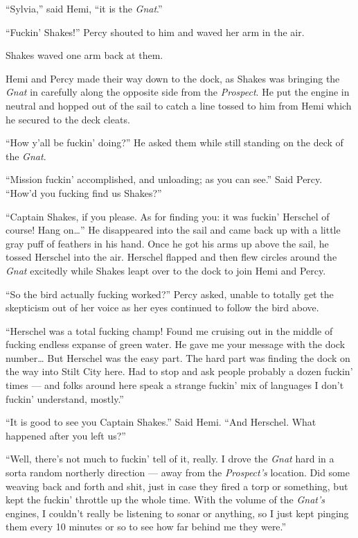 \documentclass[]{scrbook}
\begin{document}
``Sylvia,'' said Hemi, ``it is the \emph{Gnat}.''

``Fuckin' Shakes!'' Percy shouted to him and waved her arm in the air.

Shakes waved one arm back at them.

Hemi and Percy made their way down to the dock, as Shakes was bringing
the \emph{Gnat} in carefully along the opposite side from the
\emph{Prospect}. He put the engine in neutral and hopped out of the sail
to catch a line tossed to him from Hemi which he secured to the deck
cleats.

``How y'all be fuckin' doing?'' He asked them while still standing on
the deck of the \emph{Gnat}.

``Mission fuckin' accomplished, and unloading; as you can see.'' Said
Percy. ``How'd you fucking find us Shakes?''

``Captain Shakes, if you please. As for finding you: it was fuckin'
Herschel of course! Hang on\ldots{}'' He disappeared into the sail and
came back up with a little gray puff of feathers in his hand. Once he
got his arms up above the sail, he tossed Herschel into the air.
Herschel flapped and then flew circles around the \emph{Gnat} excitedly
while Shakes leapt over to the dock to join Hemi and Percy.

``So the bird actually fucking worked?'' Percy asked, unable to totally
get the skepticism out of her voice as her eyes continued to follow the
bird above.

``Herschel was a total fucking champ! Found me cruising out in the
middle of fucking endless expanse of green water. He gave me your
message with the dock number\ldots{} But Herschel was the easy part. The
hard part was finding the dock on the way into Stilt City here. Had to
stop and ask people probably a dozen fuckin' times --- and folks around
here speak a strange fuckin' mix of languages I don't fuckin'
understand, mostly.''

``It is good to see you Captain Shakes.'' Said Hemi. ``And Herschel.
What happened after you left us?''

``Well, there's not much to fuckin' tell of it, really. I drove the
\emph{Gnat} hard in a sorta random northerly direction --- away from the
\emph{Prospect's} location. Did some weaving back and forth and shit,
just in case they fired a torp or something, but kept the fuckin'
throttle up the whole time. With the volume of the \emph{Gnat's}
engines, I couldn't really be listening to sonar or anything, so I just
kept pinging them every 10 minutes or so to see how far behind me they
were.''
\end{document}
